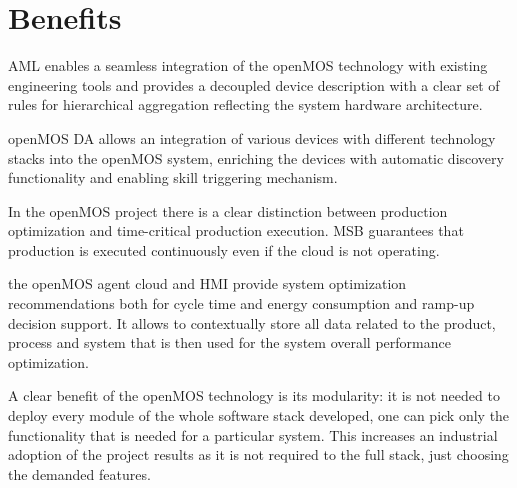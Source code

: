 \section{Benefits}
\gls{AML} enables a seamless integration of the \gls{openMOS} technology with existing engineering tools and provides a decoupled device description with a clear set of rules for hierarchical aggregation reflecting the system hardware architecture.

\gls{openMOS} \gls{DA} allows an integration of various devices with different technology stacks into the \gls{openMOS} system, enriching the devices with automatic discovery functionality and enabling skill triggering mechanism.

In the \gls{openMOS} project there is a clear distinction between production optimization and time-critical production execution.
\gls{MSB} guarantees that production is executed continuously even if the cloud is not operating.

the \gls{openMOS} agent cloud and \gls{HMI} provide system optimization recommendations both for cycle time and energy consumption and ramp-up decision support. 
It allows to contextually store all data related to the product, process and system that is then used for the system overall performance optimization.

A clear benefit of the \gls{openMOS} technology is its modularity: it is not needed to deploy every module of the whole software stack developed, one can pick only the functionality that is needed for a particular system.
This increases an industrial adoption of the project results as it is not required to the full stack, just choosing the demanded features.
